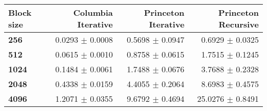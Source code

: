 \begin{tabular}{lrrr}\toprule
\textbf{Block size}  & \textbf{Columbia Iterative} & \textbf{Princeton Iterative} & \textbf{Princeton Recursive}\\\midrule
\textbf{256}  & 0.0293 $\pm$ 0.0008 & 0.5698 $\pm$ 0.0947 & 0.6929 $\pm$ 0.0325\\
\textbf{512}  & 0.0615 $\pm$ 0.0010 & 0.8758 $\pm$ 0.0615 & 1.7515 $\pm$ 0.1245\\
\textbf{1024}  & 0.1484 $\pm$ 0.0061 & 1.7488 $\pm$ 0.0676 & 3.7688 $\pm$ 0.2328\\
\textbf{2048}  & 0.4338 $\pm$ 0.0159 & 4.4055 $\pm$ 0.2064 & 8.6983 $\pm$ 0.4575\\
\textbf{4096} & 1.2071 $\pm$ 0.0355 & 9.6792 $\pm$ 0.4694 & 25.0276 $\pm$ 0.8491\\
\bottomrule
\end{tabular}
